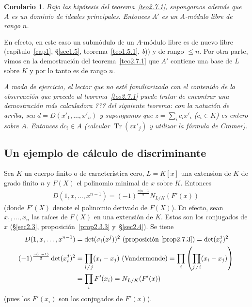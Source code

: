 \documentclass[bibtotoc,leqno,spanish]{amsbook}
\DeclareMathOperator{\Tr}{Tr}
\numberwithin{equation}{section}
\newenvironment{comm}%
	{\begin{list}{}{\setlength{\leftmargin}{2\parindent}\setlength{\topsep}{\baselineskip}}\item\itshape}
	{\end{list}}
\theoremstyle{note}
\theoremstyle{note}
\newtheorem*{corollary*}{Corolario}
\theoremstyle{rem}
\numberwithin{theorem}{section}
\numberwithin{proposition}{section}
\numberwithin{definition}{section}
\numberwithin{lemma}{section}
\numberwithin{corollary}{section}
\numberwithin{example}{section}
\numberwithin{footnote}{section}%
\begin{document}
\begin{corollary*}
Bajo las hip\'otesis del teorema~\ref{teo2.7.1}, supongamos adem\'as que $A$ es un dominio de ideales principales. Entonces
$A'$ es un $A$-m\'odulo libre de rango $n$.
\end{corollary*}

En efecto, en este caso un subm\'odulo de un $A$-m\'odulo libre es de nuevo libre
(cap\'itulo~\ref{cap1}, \S\ref{sec1.5}, teorema~\ref{teo1.5.1}, {\itshape b}))
y de rango $\leq n$. Por otra parte, vimos en la demostraci\'on del teorema~\ref{teo2.7.1} que $A'$ contiene una base de $L$ sobre
$K$ y por lo tanto es de rango $n$.

\begin{comm}
A modo de ejercicio, el lector que no est\'e familiarizado con el contenido de la observaci\'on que
precede al teorema~\ref{teo2.7.1} puede tratar de encontrar una demostraci\'on m\'as calculadora ??? del siguiente teorema:
con la notaci\'on de arriba, sea $d = D(x'_{1},\dots,x'_{n})$ y supongamos que $z = \sum_{i}c_{i}x'_{i}$
($c_{i}\in K$) es entero sobre $A$. Entonces $dc_{i}\in A$ (calcular $\Tr(zx'_{j})$ y utilizar la f\'ormula de
Cramer).
\end{comm}

\subsection*{Un ejemplo de c\'alculo de discriminante}

Sea $K$ un cuerpo finito o de caracter\'istica cero, $L = K[x]$ una extension de $K$ de grado finito $n$ y
$F(X)$ el polinomio minimal de $x$ sobre $K$. Entonces
\begin{gather}\label{eq2.7.6}
D(1,x,\dots,x^{n-1})=(-1)^{\frac{n(n-1}{2}}N_{L/K}(F'(x))
\end{gather}
(donde $F'(X)$ denote el polinomio derivado de $F(X)$). En efecto, sean $x_{1},\dots,x_{n}$ las ra\'ices de
$F(X)$ en una extensi\'on de $K$. Estos son los conjugados de $x$
(\S\ref{sec2.3}, proposici\'on~\ref{prop2.3.3} y~\S\ref{sec2.4}). Se tiene
\begin{align*}
D(1,x,\dots,x^{n-1}) &= \det(\sigma_{i}(x^{j}))^{2}\text{ (proposici\'on~\ref{prop2.7.3})} = \det(x_{i}^{j})^{2}\\
(-1)^{\frac{n(n-1)}{2}}\det(x_{i}^{j})^{2} &= \prod_{i\neq j}(x_{i}-x_{j})\text{ (Vandermonde)} =
\prod_{i}\left(\prod_{j\neq i}(x_{i}-x_{j})\right)\\
&=\prod_{i}F'(x_{i}) = N_{L/K}(F'(x))
\end{align*}
(pues los $F'(x_{i})$ son los conjugados de $F'(x)$).
\end{document}
